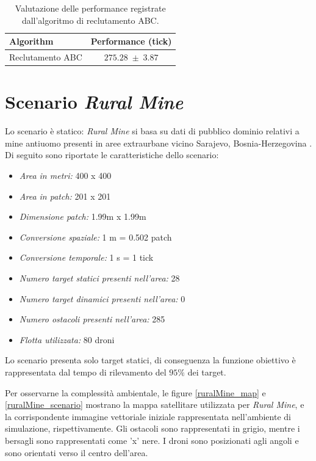 \begin{table}[H]
    \centering
    \captionsetup{justification=centering, margin=2cm, font=footnotesize}
    \begin{tabular}{|l|c|}
    \hline
    \textbf{Algorithm}              & \textbf{Performance (tick)}              \\ \hline
    Reclutamento ABC                & $275.28 \; \pm \; 3.87$           \\ \hline
    \end{tabular}%
    
    \caption{Valutazione delle performance registrate dall'algoritmo di reclutamento ABC.}
    \label{tabella_performance_dump}
\end{table}

\section{Scenario \textit{Rural Mine}}

Lo scenario è statico: \textit{Rural Mine} si basa su dati di pubblico dominio relativi a mine antiuomo presenti in aree extraurbane vicino Sarajevo, Bosnia-Herzegovina \cite{seedemining2018}.
Di seguito sono riportate le caratteristiche dello scenario:

\begin{itemize}
    \item \textit{Area in metri:} 400 x 400
    \item \textit{Area in patch:} 201 x 201
    \item \textit{Dimensione patch:} 1.99m x 1.99m
    \item \textit{Conversione spaziale:} 1 m = 0.502 patch
    \item \textit{Conversione temporale:} 1 s = 1 tick
    \item \textit{Numero target statici presenti nell'area:} 28
    \item \textit{Numero target dinamici presenti nell'area:} 0
    \item \textit{Numero ostacoli presenti nell'area:} 285
    \item \textit{Flotta utilizzata:} 80 droni
\end{itemize}

Lo scenario presenta solo target statici, di conseguenza la funzione obiettivo è rappresentata dal tempo di rilevamento del $95 \%$ dei target.

Per osservarne la complessità ambientale, le figure \ref{ruralMine_map} e \ref{ruralMine_scenario} mostrano la mappa satellitare utilizzata per \textit{Rural Mine}, e la corrispondente immagine vettoriale iniziale rappresentata nell'ambiente di simulazione, rispettivamente. 
Gli ostacoli  sono rappresentati in grigio, mentre i bersagli sono rappresentati come 'x' nere. 
I droni sono posizionati agli angoli e sono orientati verso il centro dell'area.

